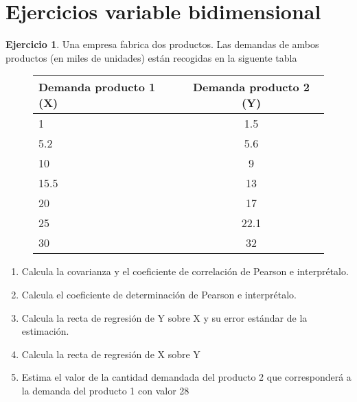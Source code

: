 \documentclass[]{article}
\theoremstyle{plain}
\theoremstyle{definition}
\newtheorem{exercise}[theorem]{Ejercicio}
\theoremstyle{definition} %
\begin{document}
\section{Ejercicios variable bidimensional}


\begin{exercise}
  Una empresa fabrica dos productos. Las demandas de ambos productos (en miles de unidades) están recogidas en la siguente tabla
\begin{figure}
  \centering
  \begin{tabular}{lc}
    Demanda producto 1 (X) & Demanda producto 2 (Y)\\
    \hline
    1 & 1.5    \\
    5.2 & 5.6  \\  
    10 & 9     \\
    15.5 & 13  \\ 
    20 & 17    \\
    25 & 22.1  \\  
    30 & 32    
  \end{tabular}
\end{figure}
\begin{enumerate}
  \item
  Calcula la covarianza y el coeficiente de correlación de Pearson e
  interprétalo.

\item Calcula el coeficiente de determinación de Pearson e interprétalo.
\item
  Calcula la recta de regresión de Y sobre X y su error estándar de la estimación.
\item
  Calcula la recta de regresión de X sobre Y
\item
  Estima el valor de la cantidad demandada del producto 2 que corresponderá a la demanda del producto 1 con valor 28
\end{enumerate}
\end{exercise}
\end{document}

